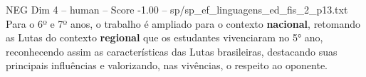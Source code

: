 \begin{textsample}{NEG Dim 4 – human – Score -1.00 – sp/sp\_ef\_linguagens\_ed\_fis\_2\_p13.txt}  \label{ex:f4_neg_018}
Para o 6º e 7º anos, o trabalho é ampliado para o contexto \textbf{nacional}, retomando as Lutas do contexto \textbf{regional} que os estudantes vivenciaram no 5{\EmojiFont °} ano, reconhecendo assim as características das Lutas brasileiras, destacando suas principais influências e valorizando, nas vivências, o respeito ao oponente.

\end{textsample}
